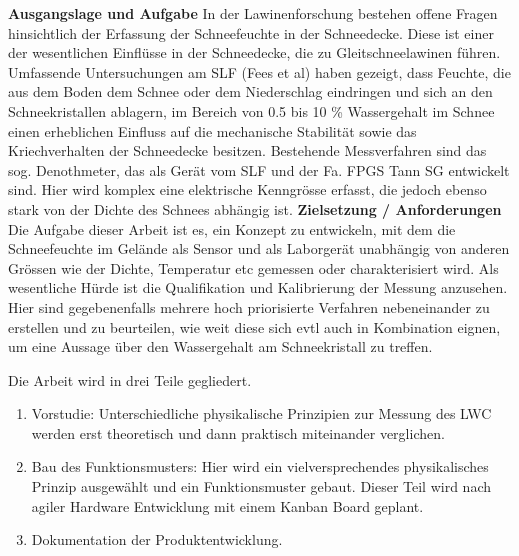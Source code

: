 


\textbf{Ausgangslage und Aufgabe}
In der Lawinenforschung bestehen offene Fragen hinsichtlich der Erfassung der Schneefeuchte in der Schneedecke. Diese ist einer der wesentlichen Einflüsse in der Schneedecke, die zu Gleitschneelawinen führen. Umfassende Untersuchungen am SLF (Fees et al) haben gezeigt, dass Feuchte, die aus dem Boden dem Schnee oder dem Niederschlag eindringen und sich an den Schneekristallen ablagern, im Bereich von 0.5 bis 10 \% Wassergehalt im Schnee einen erheblichen Einfluss auf die mechanische Stabilität sowie das Kriechverhalten der Schneedecke besitzen.
Bestehende Messverfahren sind das sog. Denothmeter, das als Gerät vom SLF und der Fa. FPGS Tann SG entwickelt sind. Hier wird komplex eine elektrische Kenngrösse erfasst, die jedoch ebenso stark von der Dichte des Schnees abhängig ist.
\textbf{Zielsetzung / Anforderungen}
Die Aufgabe dieser Arbeit ist es, ein Konzept zu entwickeln, mit dem die Schneefeuchte im Gelände als Sensor und als Laborgerät unabhängig von anderen Grössen wie der Dichte, Temperatur etc gemessen oder charakterisiert wird. Als wesentliche Hürde ist die Qualifikation und Kalibrierung der Messung anzusehen. Hier sind gegebenenfalls mehrere hoch priorisierte Verfahren nebeneinander zu erstellen und zu beurteilen, wie weit diese sich evtl auch in Kombination eignen, um eine Aussage über den Wassergehalt am Schneekristall zu treffen.


Die Arbeit wird in drei Teile gegliedert.

\begin{enumerate}
\item Vorstudie: Unterschiedliche physikalische Prinzipien zur Messung des LWC werden erst theoretisch und dann praktisch miteinander verglichen.

\item Bau des Funktionsmusters:  Hier wird ein vielversprechendes physikalisches Prinzip ausgewählt und ein Funktionsmuster gebaut. Dieser Teil wird nach agiler Hardware Entwicklung mit einem Kanban Board geplant.

\item Dokumentation der Produktentwicklung.
\end{enumerate}

